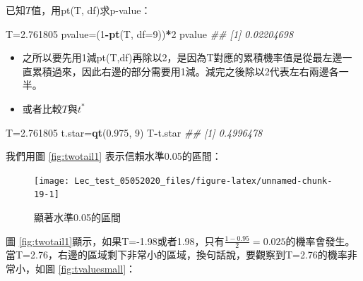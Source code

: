 \documentclass[hyperref,]{ctexart}
\newenvironment{Shaded}{\begin{snugshade}}{\end{snugshade}}
\newcommand{\CommentTok}[1]{\textcolor[rgb]{0.56,0.35,0.01}{\textit{#1}}}
\newcommand{\DataTypeTok}[1]{\textcolor[rgb]{0.13,0.29,0.53}{#1}}
\newcommand{\DecValTok}[1]{\textcolor[rgb]{0.00,0.00,0.81}{#1}}
\newcommand{\FloatTok}[1]{\textcolor[rgb]{0.00,0.00,0.81}{#1}}
\newcommand{\KeywordTok}[1]{\textcolor[rgb]{0.13,0.29,0.53}{\textbf{#1}}}
\newcommand{\NormalTok}[1]{#1}
\newcommand{\OperatorTok}[1]{\textcolor[rgb]{0.81,0.36,0.00}{\textbf{#1}}}
\providecommand{\tightlist}{%
  \setlength{\itemsep}{0pt}\setlength{\parskip}{0pt}}
\begin{document}
已知\(T\)值，用pt(T, df)求p-value：

\begin{Shaded}
\begin{Highlighting}[]
\NormalTok{T=}\FloatTok{2.761805}
\NormalTok{pvalue=(}\DecValTok{1}\OperatorTok{-}\KeywordTok{pt}\NormalTok{(T, }\DataTypeTok{df=}\DecValTok{9}\NormalTok{))}\OperatorTok{*}\DecValTok{2}
\NormalTok{pvalue}
\CommentTok{## [1] 0.02204698}
\end{Highlighting}
\end{Shaded}

\begin{itemize}
\tightlist
\item
  之所以要先用1減pt(T,df)再除以2，是因為T對應的累積機率值是從最左邊一直累積過來，因此右邊的部分需要用1減。減完之後除以2代表左右兩邊各一半。
\item
  或者比較\(T\)與\(t^{*}\)
\end{itemize}

\begin{Shaded}
\begin{Highlighting}[]
\NormalTok{T=}\FloatTok{2.761805}
\NormalTok{t.star=}\KeywordTok{qt}\NormalTok{(}\FloatTok{0.975}\NormalTok{, }\DecValTok{9}\NormalTok{)}
\NormalTok{T}\OperatorTok{-}\NormalTok{t.star}
\CommentTok{## [1] 0.4996478}
\end{Highlighting}
\end{Shaded}

我們用圖 \ref{fig:twotail1} 表示信賴水準0.05的區間：

\begin{figure}

\texttt{[image: Lec\_test\_05052020\_files/figure-latex/unnamed-chunk-19-1]} \hfill{}

\caption{\label{fig:twotail1}顯著水準0.05的區間}\label{fig:unnamed-chunk-19}
\end{figure}

圖
\ref{fig:twotail1}顯示，如果T=-1.98或者1.98，只有\(\frac{1-0.95}{2}=0.025\)的機率會發生。當T=2.76，右邊的區域剩下非常小的區域，換句話說，要觀察到T=2.76的機率非常小，如圖
\ref{fig:tvaluesmall}：
\end{document}
